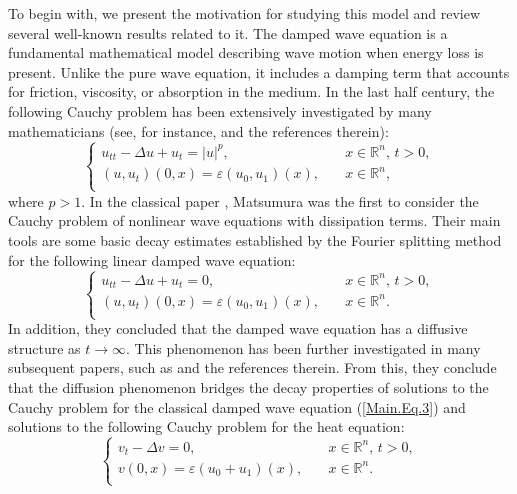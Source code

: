 \documentclass[11pt,reqno]{amsart}
\newcommand{\R}{\mathbb{R}}
\begin{document}
To begin with, we present the motivation for studying this model and review several well-known results related to it. The damped wave equation is a fundamental mathematical model describing wave motion when energy loss is present. Unlike the pure wave equation, it includes a damping term that accounts for friction, viscosity, or absorption in the medium. In the last half century, the following Cauchy problem has been extensively investigated by many mathematicians (see, for instance, \cite{Matsumura1976, Ikeda2019, Todorova2001, Zhang2001} and the references therein):
\begin{equation} \label{Main.Eq.2}
\begin{cases}
u_{tt} -\Delta u + u_t= |u|^p, &\quad x\in \R^n,\, t > 0, \\
(u, u_t)(0,x) = \varepsilon (u_0, u_1)(x), &\quad x\in \R^n, \\
\end{cases}
\end{equation}
where $p > 1$. In the classical paper \cite{Matsumura1976},
Matsumura was the first to consider the Cauchy problem of
nonlinear wave equations with dissipation terms. Their main tools are  some basic decay estimates established by  the
Fourier splitting method for the following linear damped wave equation:
\begin{equation} \label{Main.Eq.3}
\begin{cases}
u_{tt} -\Delta u + u_t= 0, &\quad x\in \R^n,\, t > 0, \\
(u, u_t)(0,x) = \varepsilon (u_0, u_1)(x), &\quad x\in \R^n. \\
\end{cases}
\end{equation}
In addition, they concluded that the damped wave equation has a diffusive structure as $t \to \infty$. This phenomenon has been further investigated in many subsequent papers, such as \cite{DabbiccoEbert2014, Michihisa2021, Takeda2015, Ikeda2019, ChenReissig2023} and the references therein. 
From this, they conclude that the diffusion phenomenon bridges the decay properties of solutions
to the Cauchy problem for the classical damped wave equation (\ref{Main.Eq.3}) and solutions to
the following Cauchy problem for the heat equation:
\begin{equation} \label{Main.Eq.4}
\begin{cases}
v_t -\Delta v = 0, &\quad x\in \R^n,\, t > 0, \\
v(0,x) = \varepsilon (u_0 + u_1)(x), &\quad x\in \R^n. \\
\end{cases}
\end{equation}
\end{document}
